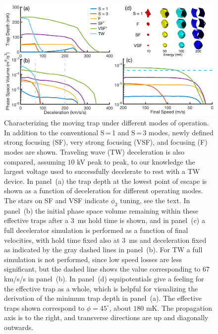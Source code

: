 \begin{figure}[t!]
\includegraphics[width=\linewidth]{Slowing/full-three-panel.png}%
\caption[Traveling Potential Well Characteristics for different Modes]{\label{fig:efftrap}
Characterizing the moving trap under different modes of operation. In addition to the conventional S\,=\,1 and S\,=\,3 modes, newly defined strong focusing (SF), very strong focusing (VSF), and focusing (F) modes are shown. Traveling wave (TW) deceleration is also compared, assuming $10$ kV peak to peak, to our knowledge the largest voltage used to successfully decelerate to rest with a TW device. In panel~(a) the trap depth at the lowest point of escape is shown as a function of deceleration for different operating modes. The stars on SF and VSF indicate $\phi_2$ tuning, see the text. In panel~(b) the initial phase space volume remaining within these effective traps after a $3$~ms hold time is shown, and in panel~(c) a full decelerator simulation is performed as a function of final velocities, with hold time fixed also at $3$~ms and deceleration fixed as indicated by the gray dashed lines in panel~(b). For TW a full simulation is not performed, since low speed losses are less significant, but the dashed line shows the value corresponding to 67 km/s/s in panel~(b). In panel~(d) equipotentials give a feeling for the effective trap as a whole, which is helpful for visualizing the derivation of the minimum trap depth in panel~(a). The effective traps shown correspond to $\phi=45^\circ$, about $180\text{ mK}$. The propagation axis is to the right, and transverse directions are up and diagonally outwards.}
\end{figure}

